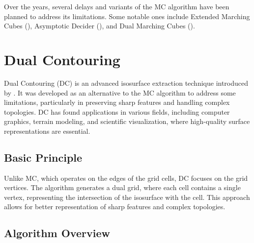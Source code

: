 Over the years, several delays and variants of the MC algorithm have been planned to address its limitations. Some notable ones include Extended Marching Cubes (\cite{Raman_2008}), Asymptotic Decider (\cite{Nielson_1991}), and Dual Marching Cubes (\cite{Nielson_2004}).

\section{Dual Contouring} \label{Dual-Contouring}

Dual Contouring (DC) is an advanced isosurface extraction technique introduced by \cite{Ju_2002}. It was developed as an alternative to the MC algorithm to address some limitations, particularly in preserving sharp features and handling complex topologies. DC has found applications in various fields, including computer graphics, terrain modeling, and scientific visualization, where high-quality surface representations are essential.

\vspace{2mm}
\subsection{Basic Principle}

Unlike MC, which operates on the edges of the grid cells, DC focuses on the grid vertices. The algorithm generates a dual grid, where each cell contains a single vertex, representing the intersection of the isosurface with the cell. This approach allows for better representation of sharp features and complex topologies.

\vspace{2mm}
\subsection{Algorithm Overview}

